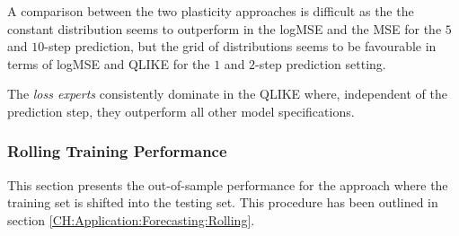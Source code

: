 A comparison between the two plasticity approaches is difficult as the the constant distribution seems to outperform in the logMSE and the MSE for the $5$ and $10$-step prediction, but the grid of distributions seems to be favourable in terms of logMSE and QLIKE for the $1$ and $2$-step prediction setting.

The \textit{loss experts} consistently dominate in the QLIKE where, independent of the prediction step, they outperform all other model specifications.

\subsubsection{Rolling Training Performance}
\label{CH:EmpiricalResults:Rolling}

This section presents the out-of-sample performance for the approach where the training set is shifted into the testing set. This procedure has been outlined in section \ref{CH:Application:Forecasting:Rolling}.


